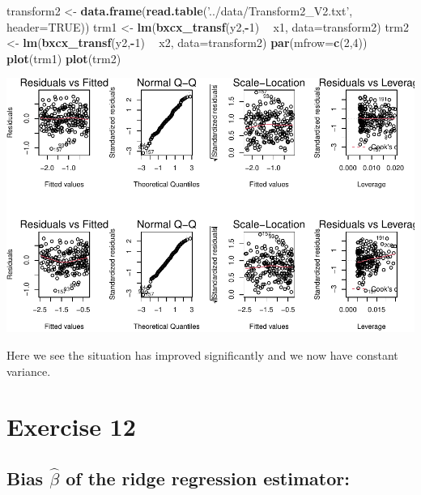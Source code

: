 \documentclass[]{article}
\newenvironment{Shaded}{\begin{snugshade}}{\end{snugshade}}
\newcommand{\DataTypeTok}[1]{\textcolor[rgb]{0.13,0.29,0.53}{#1}}
\newcommand{\DecValTok}[1]{\textcolor[rgb]{0.00,0.00,0.81}{#1}}
\newcommand{\KeywordTok}[1]{\textcolor[rgb]{0.13,0.29,0.53}{\textbf{#1}}}
\newcommand{\NormalTok}[1]{#1}
\newcommand{\OperatorTok}[1]{\textcolor[rgb]{0.81,0.36,0.00}{\textbf{#1}}}
\newcommand{\OtherTok}[1]{\textcolor[rgb]{0.56,0.35,0.01}{#1}}
\newcommand{\StringTok}[1]{\textcolor[rgb]{0.31,0.60,0.02}{#1}}
\begin{document}
\begin{Shaded}
\begin{Highlighting}[]
\NormalTok{transform2 <-}\StringTok{ }\KeywordTok{data.frame}\NormalTok{(}\KeywordTok{read.table}\NormalTok{(}\StringTok{'../data/Transform2_V2.txt'}\NormalTok{, }\DataTypeTok{header=}\OtherTok{TRUE}\NormalTok{))}
\NormalTok{trm1 <-}\StringTok{ }\KeywordTok{lm}\NormalTok{(}\KeywordTok{bxcx_transf}\NormalTok{(y2,}\OperatorTok{-}\DecValTok{1}\NormalTok{) }\OperatorTok{~}\StringTok{ }\NormalTok{x1, }\DataTypeTok{data=}\NormalTok{transform2)}
\NormalTok{trm2 <-}\StringTok{ }\KeywordTok{lm}\NormalTok{(}\KeywordTok{bxcx_transf}\NormalTok{(y2,}\OperatorTok{-}\DecValTok{1}\NormalTok{) }\OperatorTok{~}\StringTok{ }\NormalTok{x2, }\DataTypeTok{data=}\NormalTok{transform2)}
\KeywordTok{par}\NormalTok{(}\DataTypeTok{mfrow=}\KeywordTok{c}\NormalTok{(}\DecValTok{2}\NormalTok{,}\DecValTok{4}\NormalTok{))}
\KeywordTok{plot}\NormalTok{(trm1)}
\KeywordTok{plot}\NormalTok{(trm2)}
\end{Highlighting}
\end{Shaded}

\includegraphics{./figures/unnamed-chunk-35-1.pdf}

Here we see the situation has improved significantly and we now have
constant variance.

\newpage

\hypertarget{exercise-12}{%
\section{Exercise 12}\label{exercise-12}}

\hypertarget{bias-hatbeta-of-the-ridge-regression-estimator}{%
\subsection{\texorpdfstring{Bias \(\hat{\beta}\) of the ridge regression
estimator:}{Bias \textbackslash{}hat\{\textbackslash{}beta\} of the ridge regression estimator:}}\label{bias-hatbeta-of-the-ridge-regression-estimator}}
\end{document}

